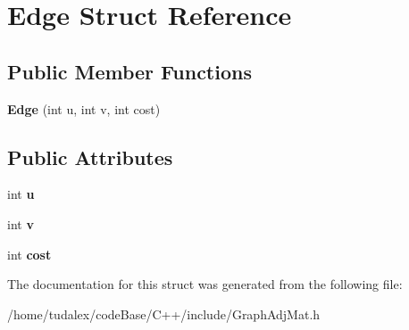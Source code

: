 \hypertarget{structEdge}{
\section{Edge Struct Reference}
\label{structEdge}
}
\subsection*{Public Member Functions}
\begin{DoxyCompactItemize}
\item 
\hypertarget{structEdge_a22f1e1ca49a024d90059cd05b94b3dc2}{
{\bfseries Edge} (int u, int v, int cost)}
\label{structEdge_a22f1e1ca49a024d90059cd05b94b3dc2}

\end{DoxyCompactItemize}
\subsection*{Public Attributes}
\begin{DoxyCompactItemize}
\item 
\hypertarget{structEdge_a60a34279415f9bff8844f0c0a8675ae3}{
int {\bfseries u}}
\label{structEdge_a60a34279415f9bff8844f0c0a8675ae3}

\item 
\hypertarget{structEdge_aac59de4b133921591182667a1e656e18}{
int {\bfseries v}}
\label{structEdge_aac59de4b133921591182667a1e656e18}

\item 
\hypertarget{structEdge_ad7099a9059c497bb6d6191b6257837cf}{
int {\bfseries cost}}
\label{structEdge_ad7099a9059c497bb6d6191b6257837cf}

\end{DoxyCompactItemize}


The documentation for this struct was generated from the following file:\begin{DoxyCompactItemize}
\item 
/home/tudalex/codeBase/C++/include/GraphAdjMat.h\end{DoxyCompactItemize}
